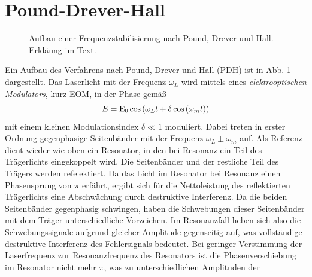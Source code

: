 \section{Pound-Drever-Hall}\label{sec:pound-drever-hall}
\begin{figure}[h]
 	\centering
	\caption[Pound-Drever-Hall - Aufbau]{Aufbau
	einer Frequenzstabilisierung nach Pound, Drever und Hall. Erkläung im
	Text.}\label{fig:pound-drever-hall_aufbau}
\end{figure}
Ein Aufbau des Verfahrens nach Pound, Drever und Hall (PDH) ist in Abb.
\ref{fig:pound-drever-hall_aufbau} dargestellt.
Das Laserlicht mit der Frequenz $\omega_L$ wird mittels eines \textit{elektrooptischen Modulators}, kurz EOM, in der Phase gemäß
\begin{equation}\label{eq:pound-drever-hall_01}
	E=\operatorname{E}_0\cos{\left(\omega_Lt+\delta\cos{(\omega_mt)}\right)}
\end{equation}
mit einem kleinen Modulationsindex $\delta\ll1$ moduliert. Dabei treten in
erster Ordnung gegenphasige Seitenbänder mit der Frequenz $\omega_L\pm\omega_m$
auf. Als Referenz dient wieder wie oben ein Resonator, in den bei Resonanz ein
Teil des Trägerlichts eingekoppelt wird. Die Seitenbänder und der restliche Teil
des Trägers werden refelektiert. Da das Licht im Resonator bei Resonanz einen
Phasensprung von $\pi$ erfährt, ergibt sich für die Nettoleistung des
reflektierten Trägerlichts eine Abschwächung durch destruktive Interferenz.
Da die beiden Seitenbänder gegenphasig schwingen, haben die Schwebungen dieser
Seitenbänder mit dem Träger unterschiedliche Vorzeichen. Im Resonanzfall heben
sich also die Schwebungssignale aufgrund gleicher Amplitude gegenseitig auf, was
vollständige destruktive Interferenz des Fehlersignals bedeutet. Bei geringer
Verstimmung der Laserfrequenz zur Resonanzfrequenz des Resonators ist die
Phasenverschiebung im Resonator nicht mehr $\pi$, was zu unterschiedlichen Amplituden der
